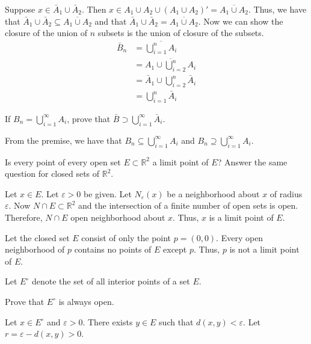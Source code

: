 \begin{exercise}
\begin{exercise}[label = (\alph*), ref = \arabic{exercisei} (\alph*)]
    Suppose \(x\in\bar{A}_1\cup \bar{A}_2\).
    Then \(x\in A_1\cup A_2\cup (A_1\cup A_2)' = \overline{A_1\cup A_2}\).
    Thus, we have that
    \(\bar{A}_1\cup \bar{A}_2\subseteq\overline{A_1\cup A_2}\) and that
    \(\bar{A}_1\cup \bar{A}_2 = \overline{A_1\cup A_2}\).
    Now we can show the closure of the union of \(n\) subsets is the union of
    closure of the subsets.
    \begin{align*}
      \bar{B}_n & = \overline{\bigcup_{i = 1}^nA_i}\\
                & = \overline{A_1\cup\bigcup_{i = 2}^nA_i}\\
                & = \bar{A}_1\cup\bigcup_{i = 2}^n\bar{A}_i\\
                & = \bigcup_{i = 1}^n\bar{A}_i
    \end{align*}
  \item
    If \(B_n = \bigcup_{i = 1}^{\infty}A_i\), prove that
    \(\bar{B}\supset\bigcup_{i = 1}^{\infty}\bar{A}_i\).
    \par\smallskip
    From the premise, we have that \(B_n\subseteq\bigcup_{i = 1}^{\infty}A_i\)
    and \(B_n\supseteq\bigcup_{i = 1}^{\infty}A_i\).
  \end{exercise}
\item
  Is every point of every open set \(E\subset\mathbb{R}^2\) a limit point of
  \(E\)?
  Answer the same question for closed sets of \(\mathbb{R}^2\).
  \par\smallskip
  Let \(x\in E\).
  Let \(\varepsilon > 0\) be given.
  Let \(N_{\varepsilon}(x)\) be a neighborhood about \(x\) of radius \(\varepsilon\).
  Now \(N\cap E\subset\mathbb{R}^2\) and the intersection of a finite number of
  open sets is open.
  Therefore, \(N\cap E\) open neighborhood about \(x\).
  Thus, \(x\) is a limit point of \(E\).
  \par\smallskip
  Let the closed set \(E\) consist of only the point \(p = (0, 0)\).
  Every open neighborhood of \(p\) contains no points of \(E\) except \(p\).
  Thus, \(p\) is not a limit point of \(E\).
\item
  Let \(E^{\circ}\) denote the set of all interior points of a set \(E\).
  \begin{exercise}[label = (\alph*), ref = \arabic{exercisei}(\alph*)]
  \item
    Prove that \(E^{\circ}\) is always open.
    \par\smallskip
    Let \(x\in E^{\circ}\) and \(\varepsilon > 0\).
    There exists \(y\in E\) such that \(d(x,y) < \varepsilon\).
    Let \(r = \varepsilon - d(x,y) > 0\).

\end{exercise}
\end{exercise}
